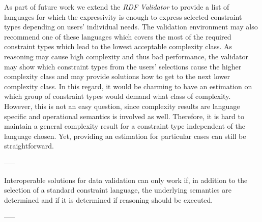 \documentclass{acm_proc_article-sp}
\begin{document}
As part of future work we extend the \emph{RDF Validator} to provide a list of languages for which the expressivity is enough to express selected constraint types
depending on users' individual needs.
The validation environment may also recommend one of these languages which covers the most of the required constraint types which lead to the lowest acceptable complexity class.
As reasoning may cause high complexity and thus bad performance, the validator may show which constraint types from the users' selections cause the higher complexity class 
and may provide solutions how to get to the next lower complexity class. 
In this regard, it would be charming to have an estimation on which group of constraint types would demand what class of complexity. However, this is not an easy question, since complexity results are language specific and operational semantics is involved as well. Therefore, it is hard to maintain a general complexity result for a constraint type independent of the language chosen. Yet, providing an estimation for particular cases can still be straightforward.

-----



Interoperable solutions for data validation can only work if, in addition to the selection of a standard constraint language,
the underlying semantics are determined and if it is determined if reasoning should be executed. 

-----
\end{document}

